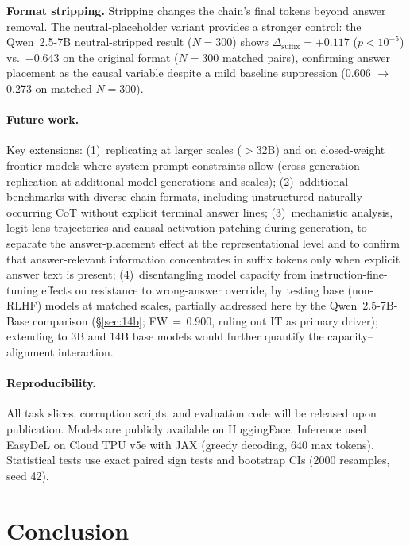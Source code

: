 \documentclass{article}
\theoremstyle{definition}
\theoremstyle{definition}
\newcommand{\QBASEVONEFW}{0.900}
\begin{document}
\textbf{Format stripping.}
Stripping changes the chain's final tokens beyond answer removal. The
neutral-placeholder variant provides a stronger control: the Qwen~2.5-7B
neutral-stripped result ($N{=}300$) shows $\Delta_\text{suffix}{=}{+}0.117$
($p{<}10^{-5}$) vs.\ $-0.643$ on the original format ($N{=}300$ matched pairs),
confirming answer placement as the causal variable despite a mild baseline suppression
(0.606 $\to$ 0.273 on matched $N{=}300$).

\paragraph{Future work.}
Key extensions: (1)~replicating at larger scales ($>$32B) and on
closed-weight frontier models where system-prompt constraints allow
(cross-generation replication at additional model generations and scales);
(2)~additional benchmarks with diverse chain formats, including unstructured
naturally-occurring CoT without explicit terminal answer lines;
(3)~mechanistic analysis, logit-lens trajectories and causal activation
patching during generation, to separate the answer-placement effect at
the representational level and to confirm that answer-relevant information
concentrates in suffix tokens only when explicit answer text is present;
(4)~disentangling model capacity from instruction-fine-tuning effects on
resistance to wrong-answer override, by testing base (non-RLHF) models
at matched scales, partially addressed here by the Qwen~2.5-7B-Base comparison
(\S\ref{sec:14b}; FW$\,=$\,\QBASEVONEFW, ruling out IT as primary driver);
extending to 3B and 14B base models would further quantify the
capacity--alignment interaction.

\paragraph{Reproducibility.}
All task slices, corruption scripts, and evaluation code will be
released upon publication. Models are publicly available on HuggingFace.
Inference used EasyDeL on Cloud TPU v5e with JAX (greedy decoding,
640 max tokens). Statistical tests use exact paired sign tests
and bootstrap CIs (2000 resamples, seed 42).

\section{Conclusion}
\label{sec:conclusion}
\end{document}
